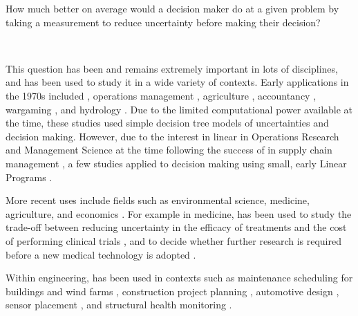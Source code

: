 \begin{cbox}[colback=Aquamarine!10!white]{}
How much better on average would a decision maker do at a given problem by taking a measurement to reduce uncertainty before making their decision?
\end{cbox}\

\noindent
This question has been and remains extremely important in lots of disciplines, and  has been used to study it in a wide variety of contexts. Early applications in the 1970s included \citep{conrad1980QuasiOptionValueExpected}, operations management \citep{bedford1966MeasuringValueInformation}, agriculture \citep{perrin1976ValueInformationValue}, accountancy \citep{mock1971ConceptsInformationValue}, wargaming \citep{oldham1996ValueInformation}, and hydrology \citep{klemes1977ValueInformationReservoir}. Due to the limited computational power available at the time, these studies used simple decision tree models of uncertainties and decision making. However, due to the interest in linear  in Operations Research and Management Science at the time \citep{williams1965StochasticLinearProgramming,dantzig1955LinearProgrammingUncertainty,wilson1966ProgrammingUncertainty} following the success of  in supply chain management \citep{dantzig1956RecentAdvancesLinear}, a few studies applied  to decision making using small, early Linear Programs \citep{avriel1970ValueInformationStochastic}.

More recent uses include fields such as environmental science, medicine, agriculture, and economics \citep{keisler2014ValueInformationAnalysis}. For example in medicine,  has been used to study the trade-off between reducing uncertainty in the efficacy of treatments and the cost of performing clinical trials \citep{willan2005ValueInformationOptimal}, and to decide whether further research is required before a new medical technology is adopted \citep{tuffaha2014ValueInformationAnalysis}.

Within engineering,  has been used in contexts such as maintenance scheduling for buildings \citep{grussing2018OptimizedBuildingComponent} and wind farms \citep{myklebust2020ValueInformationAnalysis}, construction project planning \citep{esnaasharyesfahani2020PrioritizingPreprojectPlanning}, automotive design \citep{acar2009SystemReliabilityBased}, sensor placement \citep{malings2016ValueInformationSpatially}, and structural health monitoring \citep{difrancesco2021DecisiontheoreticInspectionPlanning,difrancesco2023SystemEffectsIdentifying}.

